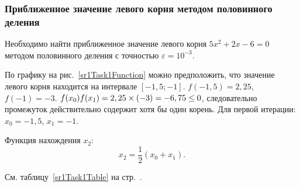 \documentclass[10pt, a4paper, titlepage]{article}
\newcommand*{\hm}[1]{#1\nobreak\discretionary{}{\hbox{$\mathsurround=0pt #1$}}{}} %
\begin{document}
\subsubsection*{Приближенное значение левого корня методом половинного деления}

Необходимо найти приближенное значение левого корня $5x^2+2x-6=0$ методом половинного деления с точностью $\varepsilon=10^{-3}$.

По графику на рис.~\ref{sr1Task1Function} можно предположить, что значение левого корня находится на интервале $[-1,5;-1]$. $f(-1,5)=2,25$, $f(-1)=-3$. $f(x_0)f(x_1) \hm =2,25\times(-3)=-6,75\leq0$, следовательно промежуток действительно содержит хотя бы один корень. Для первой итерации: $x_0=-1,5$, $x_1=-1$.

Функция нахождения $x_2$:
$$x_2=\frac{1}{2}(x_0+x_1).$$

См. таблицу~\ref{sr1Task1Table} на стр.~\pageref{sr1Task1Table}.
\end{document}

